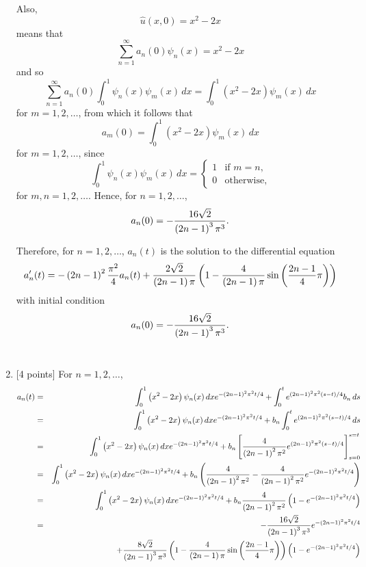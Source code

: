 \begin{solution}
\begin{enumerate}
Also,
\[
\hat{u}(x,0)=x^2-2x
\]
means that
\[
\sum_{n=1}^\infty a_n(0) \psi_n (x)=x^2-2x
\]
and so
\[
\sum_{n=1}^\infty a_n(0) \int_0^1\psi_n (x)\psi_m (x)\,dx=\int_0^1\left(x^2-2x\right)\psi_m (x)\,dx
\]
for $m=1,2,\ldots$, from which it follows that
\[
a_m(0)=\int_0^1\left(x^2-2x\right)\psi_m (x)\,dx
\]
for $m=1,2,\ldots$, since
\[
\int_0^1\psi_n (x)\psi_m (x)\,dx = \left\{\begin{array}{ll} 1 & \mbox{if }m=n, \\ 0 & \mbox{otherwise,} \end{array}\right.
\]
for $m,n=1,2,\ldots$. Hence, for $n=1,2,\ldots$,
\[
a_n(0)=-{16\sqrt{2}\over \left(2n-1\right)^3\pi^3}.
\]

Therefore, for $n=1,2,\ldots$, $a_n(t)$ is the solution to the differential equation
\[
a_n'(t)=-\left(2n-1\right)^2 {\pi^2\over4}a_n(t)+{2\sqrt{2}\over \left(2n-1\right)\pi}\left(1-{4\over \left(2n-1\right)\pi}\sin\left({2n-1\over 4}\pi\right)\right)
\]
with initial condition
\[
a_n(0)=-{16\sqrt{2}\over \left(2n-1\right)^3\pi^3}.
\]
\\
\item {[4 points]} For $n=1,2,\ldots$,
\begin{eqnarray*}
a_n(t)&=&\int_0^1\left(x^2-2x\right)\psi_n(x)\,dx e^{-\left(2n-1\right)^2\pi^2t/4}+\int_0^te^{\left(2n-1\right)^2\pi^2\left(s-t\right)/4}b_n\,ds
\\
&=&\int_0^1\left(x^2-2x\right)\psi_n(x)\,dx e^{-\left(2n-1\right)^2\pi^2t/4}+b_n\int_0^te^{\left(2n-1\right)^2\pi^2\left(s-t\right)/4}\,ds
\\
&=&\int_0^1\left(x^2-2x\right)\psi_n(x)\,dx e^{-\left(2n-1\right)^2\pi^2t/4}+b_n\left[\frac{4}{\left(2n-1\right)^2\pi^2}e^{\left(2n-1\right)^2\pi^2\left(s-t\right)/4}\right]_{s=0}^{s=t}
\\
&=&\int_0^1\left(x^2-2x\right)\psi_n(x)\,dx e^{-\left(2n-1\right)^2\pi^2t/4}+b_n\left(\frac{4}{\left(2n-1\right)^2\pi^2}-\frac{4}{\left(2n-1\right)^2\pi^2}e^{-\left(2n-1\right)^2\pi^2t/4}\right)
\\
&=&\int_0^1\left(x^2-2x\right)\psi_n(x)\,dx e^{-\left(2n-1\right)^2\pi^2t/4}+b_n\frac{4}{\left(2n-1\right)^2\pi^2}\left(1-e^{-\left(2n-1\right)^2\pi^2t/4}\right)
\\
&=&-{16\sqrt{2}\over \left(2n-1\right)^3\pi^3}e^{-\left(2n-1\right)^2\pi^2t/4}
\\
&&+{8\sqrt{2}\over\left(2n-1\right)^3\pi^3}\left(1-{4\over \left(2n-1\right)\pi}\sin\left({2n-1\over 4}\pi\right)\right)\left(1-e^{-\left(2n-1\right)^2\pi^2t/4}\right)
\\

\end{eqnarray*}
\end{enumerate}
\end{solution}
